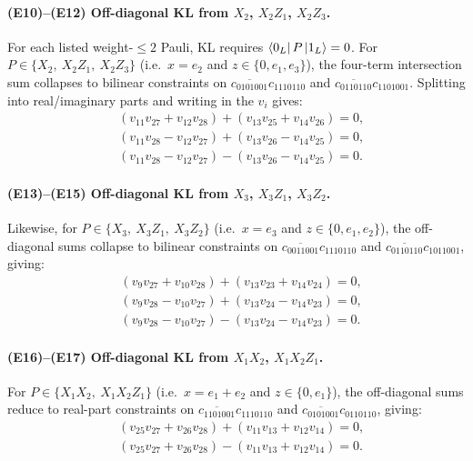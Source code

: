 \documentclass[11pt]{article}
\begin{document}
\paragraph{(E10)--(E12) Off-diagonal KL from $X_2$, $X_2Z_1$, $X_2Z_3$.}
For each listed weight-$\le2$ Pauli, KL requires $\bra{0_L}P\ket{1_L}=0$.
For $P\in\{X_2,\ X_2Z_1,\ X_2Z_3\}$ (i.e.\ $x=e_2$ and $z\in\{0,e_1,e_3\}$),
the four-term intersection sum collapses to bilinear constraints on
$\overline{c_{0101001}}c_{1110110}$ and $\overline{c_{0110110}}c_{1101001}$.
Splitting into real/imaginary parts and writing in the $v_i$ gives:
\begin{align}
\label{eq:poly-e2-z0}
&(v_{11}v_{27}+v_{12}v_{28})+(v_{13}v_{25}+v_{14}v_{26})=0,\tag{E10}\\
\label{eq:poly-e2-ze1}
&(v_{11}v_{28}-v_{12}v_{27})+(v_{13}v_{26}-v_{14}v_{25})=0,\tag{E11}\\
\label{eq:poly-e2-ze3}
&(v_{11}v_{28}-v_{12}v_{27})-(v_{13}v_{26}-v_{14}v_{25})=0.\tag{E12}
\end{align}

\paragraph{(E13)--(E15) Off-diagonal KL from $X_3$, $X_3Z_1$, $X_3Z_2$.}
Likewise, for $P\in\{X_3,\ X_3Z_1,\ X_3Z_2\}$ (i.e.\ $x=e_3$ and $z\in\{0,e_1,e_2\}$),
the off-diagonal sums collapse to bilinear constraints on
$\overline{c_{0011001}}c_{1110110}$ and $\overline{c_{0110110}}c_{1011001}$, giving:
\begin{align}
\label{eq:poly-e3-z0}
&(v_{9}v_{27}+v_{10}v_{28})+(v_{13}v_{23}+v_{14}v_{24})=0,\tag{E13}\\
\label{eq:poly-e3-ze1}
&(v_{9}v_{28}-v_{10}v_{27})+(v_{13}v_{24}-v_{14}v_{23})=0,\tag{E14}\\
\label{eq:poly-e3-ze2}
&(v_{9}v_{28}-v_{10}v_{27})-(v_{13}v_{24}-v_{14}v_{23})=0.\tag{E15}
\end{align}

\paragraph{(E16)--(E17) Off-diagonal KL from $X_1X_2$, $X_1X_2Z_1$.}
For $P\in\{X_1X_2,\ X_1X_2Z_1\}$ (i.e.\ $x=e_1+e_2$ and $z\in\{0,e_1\}$),
the off-diagonal sums reduce to real-part constraints on
$\overline{c_{1101001}}c_{1110110}$ and $\overline{c_{0101001}}c_{0110110}$, giving:
\begin{align}
\label{eq:poly-e1e2-z0}
&(v_{25}v_{27}+v_{26}v_{28})+(v_{11}v_{13}+v_{12}v_{14})=0,\tag{E16}\\
\label{eq:poly-e1e2-ze1}
&(v_{25}v_{27}+v_{26}v_{28})-(v_{11}v_{13}+v_{12}v_{14})=0.\tag{E17}
\end{align}
\end{document}
